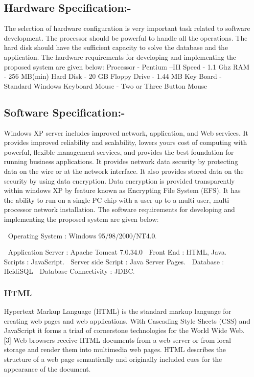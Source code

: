 \documentclass[a4paper,12pt]{article}
\begin{document}
\subsection{Hardware Specification:- }
\hspace{5mm}
 The selection of hardware configuration is very important task related to software development. The processor should be powerful to handle all the operations. The hard disk should have the sufficient capacity to solve the database and the application.
 The hardware requirements for developing and implementing the proposed system are given below:
 Processor               -    Pentium –III
Speed                                -    1.1 Ghz
RAM                                 -    256  MB(min)
Hard Disk                          -   20 GB
Floppy Drive                     -    1.44 MB
Key Board                         -    Standard Windows Keyboard
Mouse                                -    Two or Three Button Mouse
\newpage
\subsection{Software Specification:-}
\hspace{5mm}
Windows XP server includes improved network, application, and Web services. It provides improved reliability and scalability, lowers yours cost of computing with powerful, flexible management services, and provides the best foundation for running business applications. It provides network data security by protecting data on the wire or at the network interface. It also provides stored data on the security by using data encryption. Data encryption is provided transparently within windows XP by feature known as Encrypting File System (EFS). It has the ability to run on a single PC chip with a user up to a multi-user, multi-processor network installation. The software requirements for developing and implementing the proposed system are given below:
               
	Operating System        	:   Windows 95/98/2000/NT4.0.

	Application  Server	           : Apache Tomcat 7.0.34.0
	Front End                     	:   HTML, Java.
	Scripts                           	:   JavaScript.
	Server side Script         	:   Java Server Pages.
	Database                        	:  HeidiSQL
	Database Connectivity 	:   JDBC.
\newpage
\subsubsection{HTML}
Hypertext Markup Language (HTML) is the standard markup language for creating web pages and web applications. With Cascading Style Sheets (CSS) and JavaScript it forms a triad of cornerstone technologies for the World Wide Web.[3] Web browsers receive HTML documents from a web server or from local storage and render them into multimedia web pages. HTML describes the structure of a web page semantically and originally included cues for the appearance of the document.
\end{document}
